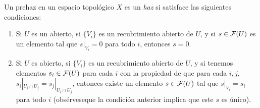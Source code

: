 \documentclass[GA.tex]{subfiles}
\begin{document}
\begin{defi}
Un prehaz en un espacio topológico $X$ es un \emph{haz} si satisface las siguientes condiciones:
\begin{enumerate}
\item Si $U$ es un abierto, si $\{V_i\}$ es un recubrimiento abierto de $U$, y si $s\in\mathcal{F}(U)$ es un elemento tal que $s|_{V_i}=0$ para todo $i$, entonces $s=0$. 
\item Si $U$ es abierto, si $\{V_i\}$ es un recubrimiento abierto de $U$, y si tenemos elementos $s_i\in\mathcal{F}(U)$ para cada $i$ con la propiedad de que para cada $i,j$, $s_i|_{U_i\cap U_j}=s_j|_{U_i\cap U_j}$, entonces existe un elemento $s\in\mathcal{F}(U)$ tal que $s|_{V_i}=s_i$ para todo $i$ (obsérveseque la condición anterior implica que este $s$ es único). 
\end{enumerate}
\end{defi}
\end{document}
